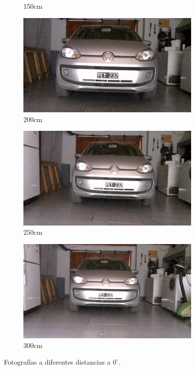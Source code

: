 \begin{figure}[bth]
\begin{subfigure}{.3\textwidth}
        \caption{150cm}
    \end{subfigure}
    \begin{subfigure}{.3\textwidth}
        \centering
        \includegraphics[width=\textwidth]{imgs/test-distancia/0_200.jpg}
        \caption{200cm}
    \end{subfigure}
    \begin{subfigure}{.3\textwidth}
        \centering
        \includegraphics[width=\textwidth]{imgs/test-distancia/0_250.jpg}
        \caption{250cm}
    \end{subfigure}
    \begin{subfigure}{.3\textwidth}
        \centering
        \includegraphics[width=\textwidth]{imgs/test-distancia/0_300.jpg}
        \caption{300cm}
    \end{subfigure}
    \caption{Fotografías a diferentes distancias a $0^\circ$.}
    \label{fig:fotos-distancia}
\end{figure}

